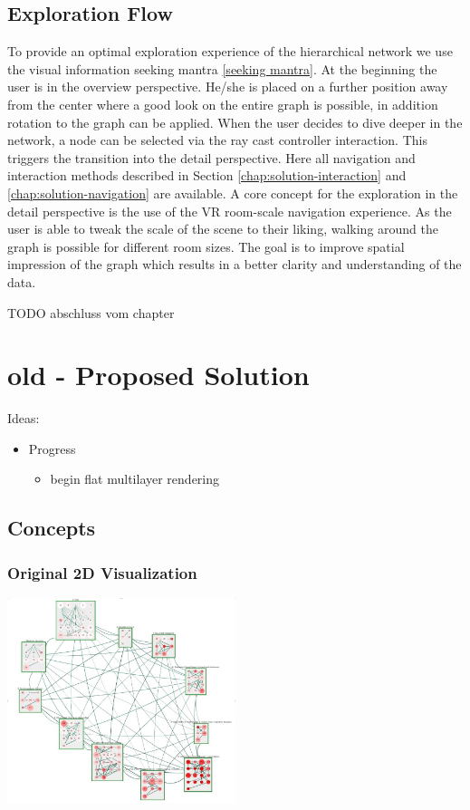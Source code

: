 


\section{Exploration Flow}
To provide an optimal exploration experience of the hierarchical network we use the visual information seeking mantra \ref{seeking mantra}. 
At the beginning the user is in the overview perspective. He/she is placed on a further position away from the center where a good look on the entire graph is possible, in addition rotation to the graph can be applied.
When the user decides to dive deeper in the network, a node can be selected via the ray cast controller interaction. This triggers the transition into the detail perspective. 
Here all navigation and interaction methods described in Section \ref{chap:solution-interaction} and \ref{chap:solution-navigation}
are available. 
A core concept for the exploration in the detail perspective is the use of the VR room-scale navigation experience. As the user is able to tweak the scale of the scene to their liking, walking around the graph is possible for different room sizes. The goal is to improve spatial impression of the graph which results in a better clarity and understanding of the data.

TODO abschluss vom chapter

\chapter{old - Proposed Solution}
Ideas:
\begin{itemize}
    \item Progress
        \begin{itemize}
            \item begin flat multilayer rendering
        \end{itemize}
\end{itemize}

\section{Concepts}
\subsection{Original 2D Visualization}
\includegraphics[width=0.5\textwidth]{chapters/graphics/2dVisOfDemoData.jpg}

